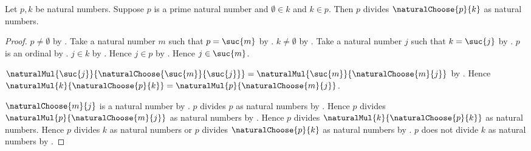 \begin{theorem}\label{prime_divides_interior_natural_choose}
    Let $p,k$ be natural numbers.
    Suppose $p$ is a prime natural number and
        $\emptyset\in k$ and $k\in p$.
    Then $p$ divides $\naturalChoose{p}{k}$ as natural numbers.
\end{theorem}
\begin{proof}
    $p\neq\emptyset$ by .
    Take a natural number $m$ such that $p=\suc{m}$ by
        .
    $k\neq\emptyset$ by .
    Take a natural number $j$ such that $k=\suc{j}$ by
        .
    $p$ is an ordinal by .
    $j\in k$ by .
    Hence $j\in p$ by .
    Hence $j\in\suc{m}$.

    $\naturalMul{\suc{j}}{
            \naturalChoose{\suc{m}}{\suc{j}}}
        =\naturalMul{\suc{m}}{\naturalChoose{m}{j}}$ by
        .
    Hence $\naturalMul{k}{\naturalChoose{p}{k}}
        =\naturalMul{p}{\naturalChoose{m}{j}}$.

    $\naturalChoose{m}{j}$ is a natural number by
        .
    $p$ divides $p$ as natural numbers by
        .
    Hence $p$ divides
        $\naturalMul{p}{\naturalChoose{m}{j}}$ as natural numbers by
        .
    Hence $p$ divides
        $\naturalMul{k}{\naturalChoose{p}{k}}$ as natural numbers.
    Hence $p$ divides $k$ as natural numbers or
        $p$ divides $\naturalChoose{p}{k}$ as natural numbers by
        .
    $p$ does not divide $k$ as natural numbers by
        .
\end{proof}
